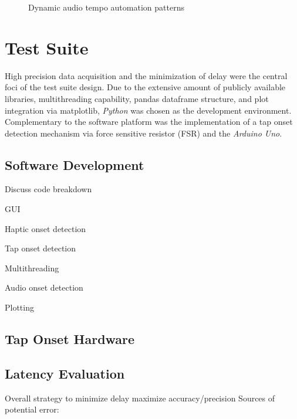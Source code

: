 \begin{figure}[H]
    \centering
    \caption{Dynamic audio tempo automation patterns}
        \qquad
    \label{fig:dynamic_audio}
\end{figure}

\section{Test Suite}
High precision data acquisition and the minimization of delay were the central foci of the test suite design. Due to the extensive amount of publicly available libraries, multithreading capability, pandas dataframe structure, and plot integration via matplotlib, \textit{Python} was chosen as the development environment. Complementary to the software platform was the implementation of a tap onset detection mechanism via force sensitive resistor (FSR) and the \textit{Arduino Uno}. 

\subsection{Software Development} \label{development}
            Discuss code breakdown
            
            GUI
            
            Haptic onset detection
            
            Tap onset detection
            
            Multithreading
            
            Audio onset detection
            
            Plotting

\subsection{Tap Onset Hardware}    \label{tap_arduino}

\subsection{Latency Evaluation} \label{latencyCalc}
Overall strategy to minimize delay maximize accuracy/precision
Sources of potential error:

